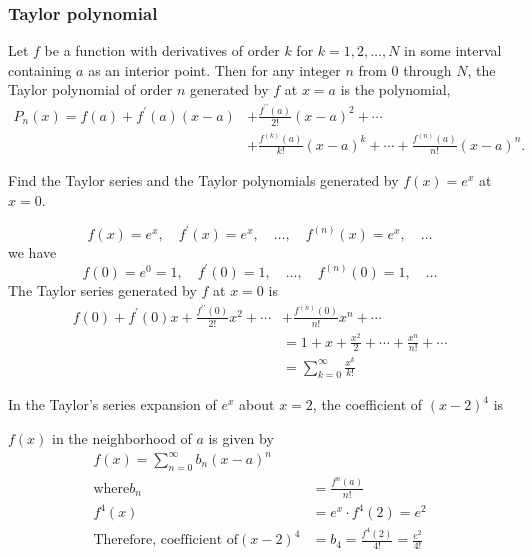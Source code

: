 \subsubsection{Taylor polynomial}
Let $f$ be a function with derivatives of order $k$ for $k=1,2, \ldots, N$ in some interval containing $a$ as an interior point. Then for any integer $n$ from 0 through $N$, the Taylor polynomial of order $n$ generated by $f$ at $x=a$ is the polynomial,
$$
\begin{aligned}
P_{n}(x)=f(a)+f^{\prime}(a)(x-a) &+\frac{f^{\prime \prime}(a)}{2 !}(x-a)^{2}+\cdots \\
&+\frac{f^{(k)}(a)}{k !}(x-a)^{k}+\cdots+\frac{f^{(n)}(a)}{n !}(x-a)^{n} .
\end{aligned}
$$
\begin{exercise}
	Find the Taylor series and the Taylor polynomials generated by $f(x)=e^{x}$ at $x=0$.
\end{exercise}
\begin{answer}
	$$
	f(x)=e^{x}, \quad f^{\prime}(x)=e^{x}, \quad \ldots, \quad f^{(n)}(x)=e^{x}, \quad \ldots
	$$
	we have
	$$
	f(0)=e^{0}=1, \quad f^{\prime}(0)=1, \quad \ldots, \quad f^{(n)}(0)=1, \quad \ldots
	$$
	The Taylor series generated by $f$ at $x=0$ is
	\begin{align*}
	f(0)+f^{\prime}(0) x+\frac{f^{\prime \prime}(0)}{2 !} x^{2}+\cdots &+\frac{f^{(n)}(0)}{n !} x^{n}+\cdots \\
	&=1+x+\frac{x^{2}}{2}+\cdots+\frac{x^{n}}{n !}+\cdots \\
	&=\sum_{k=0}^{\infty} \frac{x^{k}}{k !}
	\end{align*}
	
\end{answer}
\begin{exercise}
	In the Taylor's series expansion of $e^{x}$ about $x=2$, the coefficient of $(x-2)^{4}$ is
\end{exercise}
\begin{answer}
	$f(x)$ in the neighborhood of $a$ is given by
	\begin{align*}
f(x)=\sum_{n=0}^{\infty} b_{n}(x-a)^{n}\\
\text{where} b_{n}&=\frac{f^{n}(a)}{n !}\\
f^{4}(x)&=e^{x} \cdot f^{4}(2)=e^{2}\\
\text{Therefore, coefficient of}(x-2)^{4}&=b_{4}=\frac{f^{4}(2)}{4 !}=\frac{e^{2}}{4 !}
\end{align*}
\end{answer}
\newpage
{}
